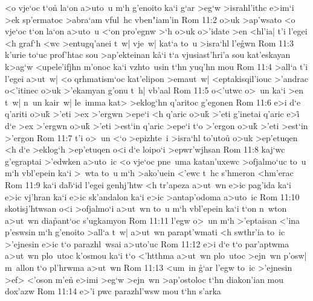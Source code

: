 <o
vje`oc
t`on\r{}
la`on
a>uto~u
m`h
g'enoito
ka`i
g`ar
>eg`w
>israhl'ithc
e>im`i
>ek
sp'ermatoc
>abra`am
vful~hc
vben"iam'in\bibvsend
\vs Rom 11:2
o>uk
>ap'wsato
<o
vje`oc
t`on
la`on
a>uto~u
<`on
pro'egnw
>`h
o>uk
o>'idate
>en
<hl'ia|
t'i
l'egei
<h
graf`h
<wc
>entugq'anei
t~w|
vje~w|
kat`a
to~u
>isra`hl
l'e\r{g}wn\bibvsend
{}
\vs Rom 11:3
k'urie
to`uc
prof'htac
sou
>ap'ekteinan
k\r{a}`i
t`a
vjusiast'hri'a
sou
kat'eskayan
k>ag`w
<upele'ifjhn
m'onoc
ka`i
vzhto~usin
t`hn
yuq'hn
mou\bibvsend
\vs Rom 11:4
>all`a
t'i
l'egei
a>ut~w|
<o
qrhmatism`oc
kat'elipon
>emaut~w|
<eptakisqil'iouc
>'andrac
o<'itinec
o>uk
>'ekamyan
g'onu
t~h|
vb'aal\bibvsend
\vs Rom 11:5
o<'utwc
o>~un
ka`i
>en
t~w|
n~un
kair~w|
le~imma
kat>
>eklog`hn
q'aritoc
g'egonen\bibvsend
\vs Rom 11:6
e>i
d`e
q'ariti
o>uk\r{}
>'eti
>ex
>'ergwn
>epe`i
<h
q'aric
o>uk\r{}
>'eti
g'inetai
q'aric
e>i\r{}
d`e
>ex
>'ergwn
o>uk\r{}
>'eti
>est`in
q'aric
>epe`i
t`o
>'ergon
o>uk\r{}
>'eti
>est`in
>'ergon\bibvsend
\vs Rom 11:7
t'i
o>~un
<`o
>epizhte~i
>isra`hl
to'uto\r{u}
o>uk
>ep'etuqen
<h
d`e
>eklog`h
>ep'etuqen
o<i
d`e
loipo`i
>epwr'wjhsan\bibvsend
\vs Rom 11:8
kaj`wc
g'egraptai
>'edwken
a>uto~ic
<o
vje`oc
pne~uma
katan'uxewc
>ofjalmo`uc
to~u
m`h
vbl'epein
ka`i
>~wta
to~u
m`h
>ako'uein
<'ewc
t~hc
s'hmeron
<hm'erac\bibvsend
\vs Rom 11:9
ka`i
da\r{b}`id
l'egei
genhj'htw
<h
tr'apeza
a>ut~wn
e>ic
pag'ida
ka`i
e>ic
vj'hran
ka`i
e>ic
sk'andalon
ka`i
e>ic
>antap'odoma
a>uto~ic\bibvsend
\vs Rom 11:10
skotisj'htwsan
o<i
>ofjalmo`i
a>ut~wn
to~u
m`h
vbl'epein
ka`i
t`on
n~wton
a>ut~wn
dia\r{p}ant`oc
s'ugkamyon\bibvsend
\vs Rom 11:11
l'egw
o>~un
m`h
>'eptaisan
<'ina
p'eswsin
m`h
g'enoito
>all`a
t~w|
a>ut~wn
parapt'wmati
<h
swthr'ia
to~ic
>'ejnesin
e>ic
t`o
parazhl~wsai
a>uto'uc\bibvsend
\vs Rom 11:12
e>i
d`e
t`o
par'aptwma
a>ut~wn
plo~utoc
k'osmou
ka`i
t`o
<'htthma
a>ut~wn
plo~utoc
>ejn~wn
p'osw|
m~allon
t`o
pl'hrwma
a>ut~wn\bibvsend
\vs Rom 11:13
<um~in
\r{g}`ar
l'egw
to~ic
>'ejnesin
>ef>
<'oson
m'e\r{n}
e>imi
>eg`w
>ejn~wn
>ap'ostoloc
t`hn
diakon'ian
mou
dox'azw\bibvsend
\vs Rom 11:14
e>'i
pwc
parazhl'wsw
mou
t`hn
s'arka

